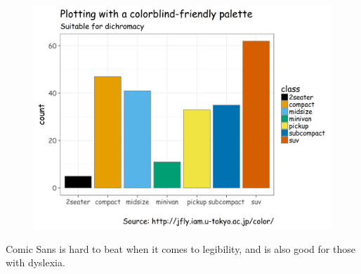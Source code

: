 
\begin{frame}
  \begin{figure}[htp!]
    \centering
    \includegraphics[width=0.9\linewidth]{fig/barchart-comicsansms.png}
  \end{figure}

  \small Comic Sans is hard to beat when it comes to legibility, and
  is also good for those with dyslexia.
  
\end{frame}


